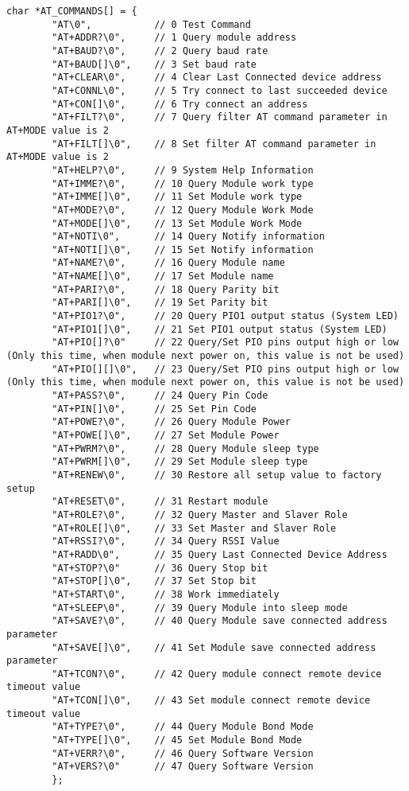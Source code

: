 \begin{code}
\begin{verbatim}
char *AT_COMMANDS[] = {
        "AT\0",           // 0 Test Command
        "AT+ADDR?\0",     // 1 Query module address
        "AT+BAUD?\0",     // 2 Query baud rate
        "AT+BAUD[]\0",    // 3 Set baud rate
        "AT+CLEAR\0",     // 4 Clear Last Connected device address
        "AT+CONNL\0",     // 5 Try connect to last succeeded device
        "AT+CON[]\0",     // 6 Try connect an address
        "AT+FILT?\0",     // 7 Query filter AT command parameter in AT+MODE value is 2
        "AT+FILT[]\0",    // 8 Set filter AT command parameter in AT+MODE value is 2
        "AT+HELP?\0",     // 9 System Help Information
        "AT+IMME?\0",     // 10 Query Module work type
        "AT+IMME[]\0",    // 11 Set Module work type
        "AT+MODE?\0",     // 12 Query Module Work Mode
        "AT+MODE[]\0",    // 13 Set Module Work Mode
        "AT+NOTI\0",      // 14 Query Notify information
        "AT+NOTI[]\0",    // 15 Set Notify information
        "AT+NAME?\0",     // 16 Query Module name
        "AT+NAME[]\0",    // 17 Set Module name
        "AT+PARI?\0",     // 18 Query Parity bit
        "AT+PARI[]\0",    // 19 Set Parity bit
        "AT+PIO1?\0",     // 20 Query PIO1 output status (System LED)
        "AT+PIO1[]\0",    // 21 Set PIO1 output status (System LED)
        "AT+PIO[]?\0"     // 22 Query/Set PIO pins output high or low (Only this time, when module next power on, this value is not be used)
        "AT+PIO[][]\0",   // 23 Query/Set PIO pins output high or low (Only this time, when module next power on, this value is not be used)
        "AT+PASS?\0",     // 24 Query Pin Code
        "AT+PIN[]\0",     // 25 Set Pin Code
        "AT+POWE?\0",     // 26 Query Module Power
        "AT+POWE[]\0",    // 27 Set Module Power
        "AT+PWRM?\0",     // 28 Query Module sleep type
        "AT+PWRM[]\0",    // 29 Set Module sleep type
        "AT+RENEW\0",     // 30 Restore all setup value to factory setup
        "AT+RESET\0",     // 31 Restart module
        "AT+ROLE?\0",     // 32 Query Master and Slaver Role
        "AT+ROLE[]\0",    // 33 Set Master and Slaver Role
        "AT+RSSI?\0",     // 34 Query RSSI Value
        "AT+RADD\0",      // 35 Query Last Connected Device Address
        "AT+STOP?\0"      // 36 Query Stop bit
        "AT+STOP[]\0",    // 37 Set Stop bit
        "AT+START\0",     // 38 Work immediately
        "AT+SLEEP\0",     // 39 Query Module into sleep mode
        "AT+SAVE?\0",     // 40 Query Module save connected address parameter
        "AT+SAVE[]\0",    // 41 Set Module save connected address parameter
        "AT+TCON?\0",     // 42 Query module connect remote device timeout value
        "AT+TCON[]\0",    // 43 Set module connect remote device timeout value
        "AT+TYPE?\0",     // 44 Query Module Bond Mode
        "AT+TYPE[]\0",    // 45 Set Module Bond Mode
        "AT+VERR?\0",     // 46 Query Software Version
        "AT+VERS?\0"      // 47 Query Software Version
        };


\end{verbatim}
\end{code}
